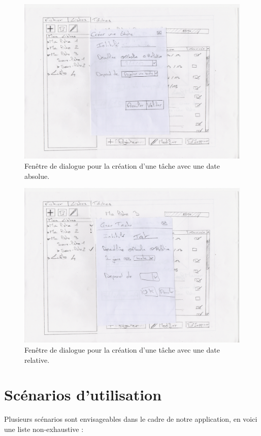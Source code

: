 		\begin{figure}[h!]
			\centering
		   \includegraphics[scale=1.5]{img/pp_ihm_5.png}
		   \caption{Fenêtre de dialogue pour la création d'une tâche avec une date absolue.}
		\end{figure}
		\FloatBarrier

		\begin{figure}[h!]
			\centering
		   \includegraphics[scale=1.5]{img/pp_ihm_6.png}
		   \caption{Fenêtre de dialogue pour la création d'une tâche avec une date relative.}
		\end{figure}
		\FloatBarrier


	\section{Scénarios d'utilisation}
		Plusieurs scénarios sont envisageables dans le cadre de notre application, en voici une liste non-exhaustive :
	
